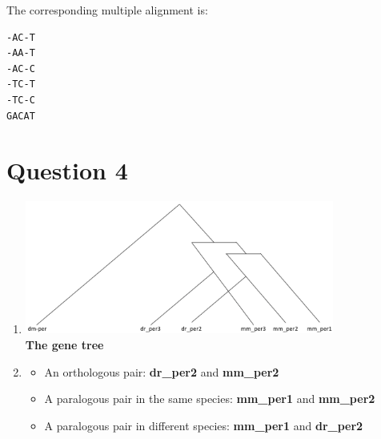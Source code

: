 \documentclass[a4paper,11pt]{article}
\begin{document}
The corresponding multiple alignment is:
\begin{verbatim}
-AC-T
-AA-T
-AC-C
-TC-T
-TC-C
GACAT
\end{verbatim}


\section*{Question 4}

\begin{enumerate}
\item 
\begin{center}
\includegraphics[width=0.8\textwidth]{tree.png}\\
\vspace{0.5cm}
{\bf The gene tree}
\end{center}

\item
\begin{itemize} 
\item An orthologous pair: {\bf dr\_per2} and {\bf mm\_per2}

\item A paralogous pair in the same species: {\bf mm\_per1} and {\bf mm\_per2}

\item A paralogous pair in different species: {\bf mm\_per1} and {\bf dr\_per2}
\end{itemize}
\end{enumerate}
\end{document}
